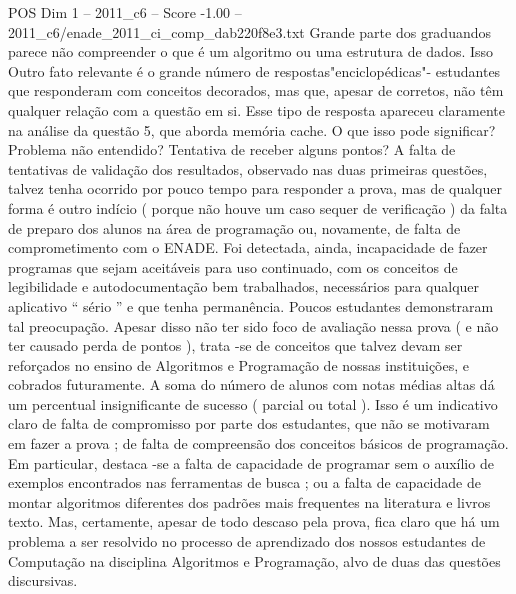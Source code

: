 \begin{textsample}{POS Dim 1 – 2011\_c6 – Score -1.00 – 2011\_c6/enade\_2011\_ci\_comp\_dab220f8e3.txt}
Grande parte dos graduandos parece não compreender o que é um algoritmo ou uma estrutura de dados.
Isso Outro fato relevante é o grande número de respostas"enciclopédicas"- estudantes que responderam com conceitos decorados, mas que, apesar de corretos, não têm qualquer relação com a questão em si.
Esse tipo de resposta apareceu claramente na análise da questão 5, que aborda memória cache.
O que isso pode significar?
Problema não entendido?
Tentativa de receber alguns pontos?
A falta de tentativas de validação dos resultados, observado nas duas primeiras questões, talvez tenha ocorrido por pouco tempo para responder a prova, mas de qualquer forma é outro indício ( porque não houve um caso sequer de verificação ) da falta de preparo dos alunos na área de programação ou, novamente, de falta de comprometimento com o ENADE.
Foi detectada, ainda, incapacidade de fazer programas que sejam aceitáveis para uso continuado, com os conceitos de legibilidade e autodocumentação bem trabalhados, necessários para qualquer aplicativo “ sério ” e que tenha permanência.
Poucos estudantes demonstraram tal preocupação.
Apesar disso não ter sido foco de avaliação nessa prova ( e não ter causado perda de pontos ), trata -se de conceitos que talvez devam ser reforçados no ensino de Algoritmos e Programação de nossas instituições, e cobrados futuramente.
A soma do número de alunos com notas médias altas dá um percentual insignificante de sucesso ( parcial ou total ).
Isso é um indicativo claro de falta de compromisso por parte dos estudantes, que não se motivaram em fazer a prova ; de falta de compreensão dos conceitos básicos de programação.
Em particular, destaca -se a falta de capacidade de programar sem o auxílio de exemplos encontrados nas ferramentas de busca ; ou a falta de capacidade de montar algoritmos diferentes dos padrões mais frequentes na literatura e livros texto.
Mas, certamente, apesar de todo descaso pela prova, fica claro que há um problema a ser resolvido no processo de aprendizado dos nossos estudantes de Computação na disciplina Algoritmos e Programação, alvo de duas das questões discursivas.

\end{textsample}
